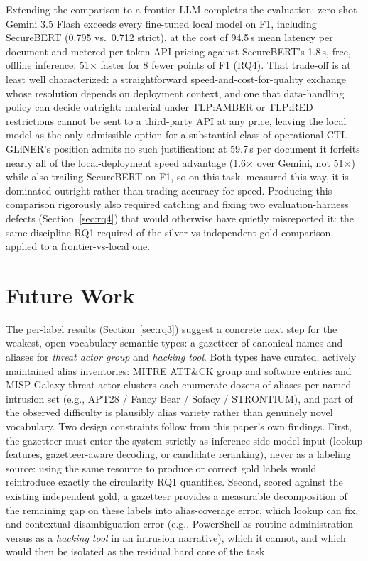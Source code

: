 \documentclass[11pt]{article}
\begin{document}
Extending the comparison to a frontier LLM completes the evaluation: zero-shot
Gemini 3.5 Flash exceeds every fine-tuned local model on F1, including
SecureBERT (0.795 vs.\ 0.712 strict), at the cost of 94.5\,s mean latency
per document and metered per-token API pricing against SecureBERT's
1.8\,s, free, offline inference: 51$\times$ faster for 8 fewer points of
F1 (RQ4). That trade-off is at least well characterized: a straightforward
speed-and-cost-for-quality exchange whose resolution depends on deployment
context, and one that data-handling policy can decide outright: material
under TLP:AMBER or TLP:RED restrictions cannot be sent to a third-party
API at any price, leaving the local model as the only admissible option
for a substantial class of operational CTI. GLiNER's position admits no such justification: at 59.7\,s per
document it forfeits nearly all of the local-deployment speed advantage
(1.6$\times$ over Gemini, not 51$\times$) while also trailing SecureBERT on
F1, so on this task, measured this way, it is dominated outright rather
than trading accuracy for speed. Producing this comparison rigorously also
required catching and fixing two evaluation-harness defects
(Section~\ref{sec:rq4}) that would otherwise have quietly misreported
it: the same discipline RQ1 required of the silver-vs-independent gold
comparison, applied to a frontier-vs-local one.

\section{Future Work}
\label{sec:future-work}

The per-label results (Section~\ref{sec:rq3}) suggest a concrete next step
for the weakest, open-vocabulary semantic types: a gazetteer of canonical
names and aliases for \emph{threat actor group} and \emph{hacking tool}.
Both types have curated, actively maintained alias inventories: MITRE
ATT\&CK group and software entries and MISP Galaxy threat-actor clusters
each enumerate dozens of aliases per named intrusion set (e.g., APT28 /
Fancy Bear / Sofacy / STRONTIUM), and part of the observed difficulty is
plausibly alias variety rather than genuinely novel vocabulary. Two design
constraints follow from this paper's own findings. First, the gazetteer
must enter the system strictly as inference-side model input (lookup
features, gazetteer-aware decoding, or candidate reranking), never as a
labeling source: using the same resource to produce or correct gold labels
would reintroduce exactly the circularity RQ1 quantifies. Second, scored
against the existing independent gold, a gazetteer provides a measurable
decomposition of the remaining gap on these labels into alias-coverage
error, which lookup can fix, and contextual-disambiguation error (e.g.,
PowerShell as routine administration versus as a \emph{hacking tool} in an
intrusion narrative), which it cannot, and which would then be isolated as
the residual hard core of the task.
\end{document}
